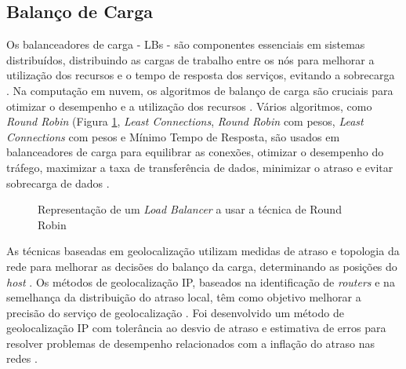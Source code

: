 \subsection{Balanço de Carga}

Os balanceadores de carga - \acp{LB} - são componentes essenciais em sistemas distribuídos, 
distribuindo as cargas de trabalho entre os nós para melhorar a utilização dos recursos e o tempo 
de resposta dos serviços, evitando a sobrecarga \cite{lb2012}. Na computação em nuvem, os 
algoritmos de balanço de carga são cruciais para otimizar o desempenho e a utilização dos recursos 
\cite{lb2016}. Vários algoritmos, como \textit{Round Robin} (Figura \ref{fig:lb-rr}, 
\textit{Least Connections}, \textit{Round Robin} com pesos, \textit{Least Connections} com pesos e 
Mínimo Tempo de Resposta, são usados em balanceadores de carga para equilibrar as conexões, 
otimizar o desempenho do tráfego, maximizar a taxa de transferência de dados, minimizar o atraso e 
evitar sobrecarga de dados \cite{lb2021}.

\begin{figure}[H]
    \centering
    \qquad
    \caption{Representação de um \textit{Load Balancer} a usar a técnica de Round Robin}%
    \label{fig:lb-rr}%
\end{figure}


As técnicas baseadas em geolocalização utilizam medidas de atraso e topologia da rede para melhorar 
as decisões do balanço da carga, determinando as posições do \textit{host} \cite{lb2016b}. Os 
métodos de geolocalização IP, baseados na identificação de \textit{routers} e na semelhança da 
distribuição do atraso local, têm como objetivo melhorar a precisão do serviço de geolocalização
\cite{lb2006}. Foi desenvolvido um método de geolocalização IP com tolerância ao desvio de atraso 
e estimativa de erros para resolver problemas de desempenho relacionados com a inflação do atraso 
nas redes \cite{lb2018}.

